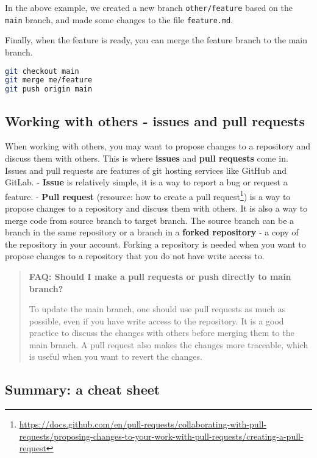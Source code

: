 \documentclass[
  notoc %
]{tufte-book}
\DeclareRobustCommand{\href}[2]{#2\footnote{\url{#1}}}
\newcommand{\passthrough}[1]{#1}
\begin{document}
In the above example, we created a new branch
\passthrough{\lstinline!other/feature!} based on the
\passthrough{\lstinline!main!} branch, and made some changes to the file
\passthrough{\lstinline!feature.md!}.

Finally, when the feature is ready, you can merge the feature branch to
the main branch.

\begin{lstlisting}[language=bash]
git checkout main
git merge me/feature
git push origin main
\end{lstlisting}

\hypertarget{working-with-others---issues-and-pull-requests}{%
\subsection{Working with others - issues and pull
requests}\label{working-with-others---issues-and-pull-requests}}

When working with others, you may want to propose changes to a
repository and discuss them with others. This is where \textbf{issues}
and \textbf{pull requests} come in. Issues and pull requests are
features of git hosting services like GitHub and GitLab. -
\textbf{Issue} is relatively simple, it is a way to report a bug or
request a feature. - \textbf{Pull request} (resource:
\href{https://docs.github.com/en/pull-requests/collaborating-with-pull-requests/proposing-changes-to-your-work-with-pull-requests/creating-a-pull-request}{how
to create a pull request}) is a way to propose changes to a repository
and discuss them with others. It is also a way to merge code from source
branch to target branch. The source branch can be a branch in the same
repository or a branch in a \textbf{forked repository} - a copy of the
repository in your account. Forking a repository is needed when you want
to propose changes to a repository that you do not have write access to.

\begin{quote}
\textbf{FAQ: Should I make a pull requests or push directly to main
branch?}

To update the main branch, one should use pull requests as much as
possible, even if you have write access to the repository. It is a good
practice to discuss the changes with others before merging them to the
main branch. A pull request also makes the changes more traceable, which
is useful when you want to revert the changes.
\end{quote}

\hypertarget{summary-a-cheat-sheet}{%
\subsection{Summary: a cheat sheet}\label{summary-a-cheat-sheet}}
\end{document}
